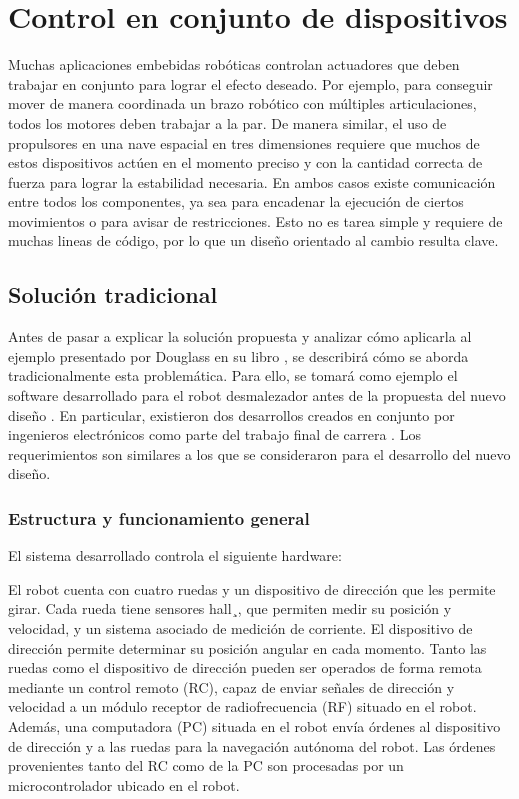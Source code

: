 \section{Control en conjunto de dispositivos}
Muchas aplicaciones embebidas robóticas controlan \gls{actuadores} que deben trabajar en conjunto para lograr el efecto deseado. Por ejemplo, para conseguir mover de manera coordinada un brazo robótico con múltiples articulaciones, todos los motores deben trabajar a la par. De manera similar, el uso de propulsores en una nave espacial en tres dimensiones requiere que muchos de estos dispositivos actúen en el momento preciso y con la cantidad correcta de fuerza para lograr la estabilidad necesaria. En ambos casos existe comunicación entre todos los componentes, ya sea para encadenar la ejecución de ciertos movimientos o para avisar de restricciones. Esto no es tarea simple y requiere de muchas lineas de código, por lo que un diseño orientado al cambio resulta clave.

\subsection*{Solución tradicional}

Antes de pasar a explicar la solución propuesta y analizar cómo aplicarla al ejemplo presentado por Douglass en su libro \cite{douglass}, se describirá cómo se aborda tradicionalmente esta problemática. Para ello, se tomará como ejemplo el software desarrollado para el robot desmalezador antes de la propuesta del nuevo diseño \cite{paperPomponio}. En particular, existieron dos desarrollos creados en conjunto por ingenieros electrónicos como parte del trabajo final de carrera \cite{disenioViejo1, disenioViejo2}. Los requerimientos son similares a los que se consideraron para el desarrollo del nuevo diseño.

\subsubsection*{Estructura y funcionamiento general}

El sistema desarrollado controla el siguiente hardware:

El robot cuenta con cuatro ruedas y un dispositivo de dirección que les permite girar. Cada rueda tiene sensores \gls{hall}¸, que permiten medir su posición y velocidad, y un sistema asociado de medición de corriente. El dispositivo de dirección permite determinar su posición angular en cada momento. Tanto las ruedas como el dispositivo de dirección pueden ser operados de forma remota mediante un control remoto (RC), capaz de enviar señales de dirección y velocidad a un módulo receptor de radiofrecuencia (RF) situado en el robot. Además, una computadora (PC) situada en el robot envía órdenes al dispositivo de dirección y a las ruedas para la navegación autónoma del robot. Las órdenes provenientes tanto del RC como de la PC son procesadas por un microcontrolador ubicado en el robot.

